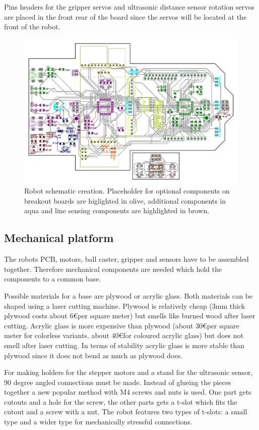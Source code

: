 \documentclass[11pt,a4paper]{article}
\begin{document}
Pins headers for the gripper servos and ultrasonic distance sensor rotation servos are placed in the front rear of the board since the servos will be located at the front of the robot. 

\begin{figure}[H]
  \centering
  \includegraphics[width=\textwidth]{robot_schematic_optional.pdf}
  \caption{Robot schematic creation. Placeholder for optional components on breakout boards are higlighted in olive, additional components in aqua and line sensing components are highlighted in brown.}
\end{figure}



\subsection{Mechanical platform}
The robots PCB, motors, ball caster, gripper and sensors have to be assembled together. Therefore mechanical components are needed which hold the components to a common base. 

Possible materials for a base are plywood or acrylic glass. Both materials can be shaped using a laser cutting machine.  Plywood is relatively cheap (3mm thick plywood costs about 6\euro per square meter) but smells like burned wood after laser cutting. Acrylic glass is more expensive than plywood (about 30\euro per square meter for colorless variants, about 40\euro for coloured acrylic glass) but does not smell after laser cutting. In terms of stability acrylic glass is more stable than plywood since it does not bend as much as plywood does.

For making holders for the stepper motors and a stand for the ultrasonic sensor, 90 degree angled connections must be made. Instead of glueing the pieces together a new popular method with M4 screws and nuts is used. One part gets cutouts and a hole for the screw, the other parts gets a t-slot which fits the cutout and a screw with a nut. The robot features two types of t-slots: a small type and a wider type for mechanically stressful connections.
\end{document}
